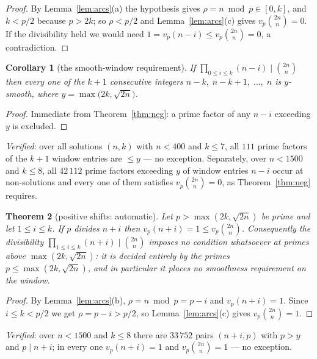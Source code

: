 \documentclass[11pt]{article}
\newtheorem{theorem}{Theorem}
\newtheorem{corollary}[theorem]{Corollary}
\begin{document}
\begin{proof}
By Lemma~\ref{lem:arcs}(a) the hypothesis gives $\rho=n\bmod p\in[0,k]$, and $k<p/2$ because
$p>2k$; so $\rho<p/2$ and Lemma~\ref{lem:arcs}(c) gives $v_p\binom{2n}{n}=0$.  If the
divisibility held we would need $1=v_p(n-i)\le v_p\binom{2n}{n}=0$, a contradiction.
\end{proof}

\begin{corollary}[the smooth-window requirement]\label{cor:smooth}
If $\prod_{0\le i\le k}(n-i)\mid\binom{2n}{n}$ then every one of the $k+1$ consecutive
integers $n-k,\;n-k+1,\;\dots,\;n$ is $y$-smooth, where $y=\max\bigl(2k,\sqrt{2n}\bigr)$.
\end{corollary}

\begin{proof}
Immediate from Theorem~\ref{thm:neg}: a prime factor of any $n-i$ exceeding $y$ is
excluded.
\end{proof}

\emph{Verified}: over all solutions $(n,k)$ with $n<400$ and $k\le7$, all $111$ prime
factors of the $k+1$ window entries are $\le y$ --- no exception.  Separately, over
$n<1500$ and $k\le8$, all $42\,112$ prime factors exceeding $y$ of window entries $n-i$
occur at non-solutions and every one of them satisfies $v_p\binom{2n}{n}=0$, as
Theorem~\ref{thm:neg} requires.

\begin{theorem}[positive shifts: automatic]\label{thm:pos}
Let $p>\max(2k,\sqrt{2n})$ be prime and let $1\le i\le k$.  If $p$ divides $n+i$ then
$v_p(n+i)=1\le v_p\binom{2n}{n}$.  Consequently the divisibility
$\prod_{1\le i\le k}(n+i)\mid\binom{2n}{n}$ imposes no condition whatsoever at primes above
$\max(2k,\sqrt{2n})$: it is decided entirely by the primes $p\le\max(2k,\sqrt{2n})$, and in
particular it places no smoothness requirement on the window.
\end{theorem}

\begin{proof}
By Lemma~\ref{lem:arcs}(b), $\rho=n\bmod p=p-i$ and $v_p(n+i)=1$.  Since $i\le k<p/2$ we
get $\rho=p-i>p/2$, so Lemma~\ref{lem:arcs}(c) gives $v_p\binom{2n}{n}=1$.
\end{proof}

\emph{Verified}: over $n<1500$ and $k\le8$ there are $33\,752$ pairs $(n+i,p)$ with
$p>y$ and $p\mid n+i$; in every one $v_p(n+i)=1$ and $v_p\binom{2n}{n}=1$ --- no exception.
\end{document}
